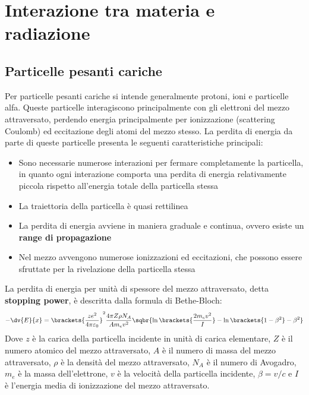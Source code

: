 \chapter[Interazione con la materia]{Interazione tra materia e radiazione}
\section{Particelle pesanti cariche}
Per particelle pesanti cariche si intende generalmente protoni, ioni e particelle alfa. Queste particelle interagiscono principalmente con gli elettroni del mezzo attraversato, perdendo energia principalmente per ionizzazione (scattering Coulomb) ed eccitazione degli atomi del mezzo stesso. La perdita di energia da parte di queste particelle presenta le seguenti caratteristiche principali:
\begin{itemize}
    \item Sono necessarie numerose interazioni per fermare completamente la particella, in quanto ogni interazione comporta una perdita di energia relativamente piccola rispetto all'energia totale della particella stessa
    \item La traiettoria della particella è quasi rettilinea
    \item La perdita di energia avviene in maniera graduale e continua, ovvero esiste un \textbf{range di propagazione}
    \item Nel mezzo avvengono numerose ionizzazioni ed eccitazioni, che possono essere sfruttate per la rivelazione della particella stessa
\end{itemize}
La perdita di energia per unità di spessore del mezzo attraversato, detta \textbf{stopping power}, è descritta dalla formula di Bethe-Bloch:
\begin{equation}
    -\dv{E}{x} = \brackets{\dfrac{ze^2}{4\pi\varepsilon_0}}^2 \dfrac{4\pi Z \rho N_A}{A m_e v^2}\sqbr{\ln\brackets{\dfrac{2 m_e v^2}{I}} - \ln\brackets{1 - \beta^2} - \beta^2}
\end{equation}
Dove $z$ è la carica della particella incidente in unità di carica elementare, $Z$ è il numero atomico del mezzo attraversato, $A$ è il numero di massa del mezzo attraversato, $\rho$ è la densità del mezzo attraversato, $N_A$ è il numero di Avogadro, $m_e$ è la massa dell'elettrone, $v$ è la velocità della particella incidente, $\beta = v/c$ e $I$ è l'energia media di ionizzazione del mezzo attraversato.


